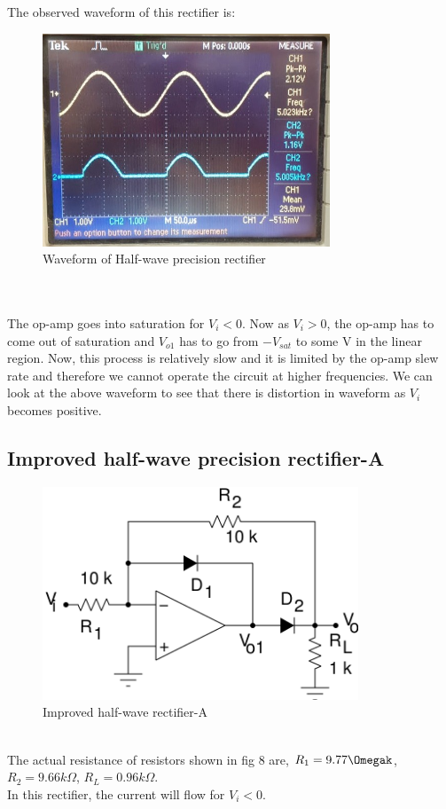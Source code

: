 \documentclass[12pt]{article}
\begin{document}
        The observed waveform of this rectifier is: 
        \begin{figure}[H]
            \centering
            \includegraphics[width = 0.6\linewidth, height = 2.5in]{reports/lab3/half-wave-5khz.jpeg}
            \caption{Waveform of Half-wave precision rectifier}
        \end{figure}\\
        \\
        The op-amp goes into saturation for $V_i < 0$. Now as $V_i > 0$, the op-amp has to come out of saturation and $V_{o1}$ has to go from $-V_{sat}$ to some V in the linear region. Now, this process is relatively slow and it is limited by the op-amp slew rate and therefore we cannot operate the circuit at higher frequencies. We can look at the above waveform to see that there is distortion in waveform as $V_i$ becomes positive.
        \\
        
\subsection{Improved half-wave precision rectifier-A}
      \begin{figure}[H]
            \centering
            \includegraphics[width = 0.5\linewidth, height = 2.5in]{reports/lab3/half-rect-A.png}
            \caption{Improved half-wave rectifier-A}
        \end{figure}
        \\
        The actual resistance of resistors shown in fig 8 are,
        $R_1 = 9.77\Omegak$, $R_2 = 9.66k\Omega$, $R_L = 0.96k\Omega$.\\
        In this rectifier, the current will flow for $V_i < 0$.
        \\
        
\end{document}
